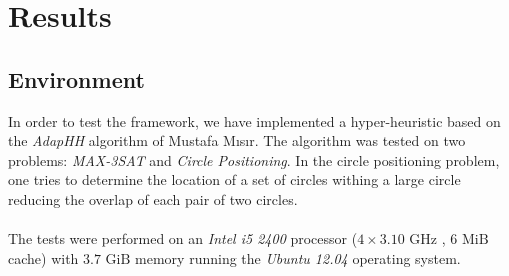 \documentclass[a4paper,10pt]{article}
\newcommand{\seclab}[1]{\label{sec:#1}}
\begin{document}
\section{Results}
\seclab{results}

\subsection{Environment}
In order to test the framework, we have implemented a hyper-heuristic based on the \emph{AdapHH}\cite{adaphh} algorithm of Mustafa M\i{}s\i{}r. The algorithm was tested on two problems: \emph{MAX-3SAT} and \emph{Circle Positioning}. In the circle positioning problem, one tries to determine the location of a set of circles withing a large circle reducing the overlap of each pair of two circles.
\paragraph{}
The tests were performed on an \emph{Intel i5 2400} processor ($4\times 3.10\mbox{ GHz}$ , $6\mbox{ MiB}$ cache) with $3.7\mbox{ GiB}$ memory running the \emph{Ubuntu 12.04} operating system.



\end{document}
